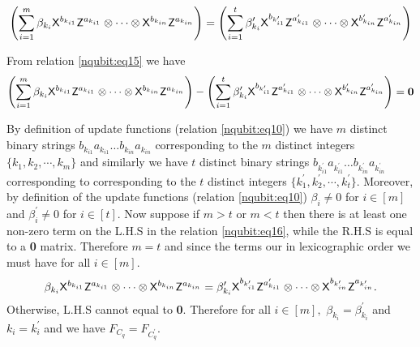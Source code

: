 \begin{equation}
\label{nqubit:eq15}
\begin{aligned}
\left(\sum_{i=1}^m \beta_{k_i} {\sf X}^{b_{k_{i1}}} {\sf Z}^{a_{k_{i1}}} \otimes \cdots  \otimes {\sf X}^{b_{k_{in}}} {\sf Z}^{a_{k_{in}}}\right)=\left(\sum_{i=1}^t \beta_{k_i}^\prime {\sf X}^{b_{k_{i1}^\prime}} {\sf Z}^{a_{k_{i1}}^\prime} \otimes \cdots  \otimes {\sf X}^{b_{k_{in}}^\prime} {\sf Z}^{a_{k_{in}}^\prime}\right)
\end{aligned}
\end{equation}

From relation \ref{nqubit:eq15} we have 
\begin{equation}
\label{nqubit:eq16}
\begin{aligned}
\left(\sum_{i=1}^m \beta_{k_i} {\sf X}^{b_{k_{i1}}} {\sf Z}^{a_{k_{i1}}} \otimes \cdots  \otimes {\sf X}^{b_{k_{in}}} {\sf Z}^{a_{k_{in}}}\right)-\left(\sum_{i=1}^t \beta_{k_i}^\prime {\sf X}^{b_{k_{i1}^\prime}} {\sf Z}^{a_{k_{i1}}^\prime} \otimes \cdots  \otimes {\sf X}^{b_{k_{in}}^\prime} {\sf Z}^{a_{k_{in}}^\prime}\right)={\bf 0}
\end{aligned}
\end{equation}

By definition of update functions (relation \ref{nqubit:eq10}) we have $m$ distinct binary strings $b_{k_{i1}} a_{k_{i1}}\ldots b_{k_{in}} a_{k_{in}}$ corresponding to the $m$ distinct integers $\{k_1,k_2,\cdots, k_m\}$ and similarly we have $t$ distinct binary strings $b_{k_{i1}^\prime} a_{k_{i1}^\prime}\ldots b_{k_{in}^\prime} a_{k_{in}^\prime}$ corresponding to corresponding to the $t$ distinct integers $\{k_1^\prime,k_2^\prime,\cdots, k_t^\prime\}.$  Moreover, by definition of the update functions (relation \ref{nqubit:eq10}) $\beta_i\neq 0$ for $i\in [m]$ and $\beta_i^\prime\neq 0$  for $i\in [t].$ Now suppose if  $m>t$ or $m<t$ then there is at least one non-zero term on the L.H.S
in the relation \ref{nqubit:eq16}, while the R.H.S is equal to a {\bf 0} matrix. Therefore $m=t$ and since the terms our in  lexicographic order we must have for all $i\in[m].$
\begin{equation}
\label{nqubit:eq17}
 \beta_{k_i}{\sf X}^{b_{k_{i1}}} {\sf Z}^{a_{k_{i1}}} \otimes \cdots  \otimes {\sf X}^{b_{k_{in}}} {\sf Z}^{a_{k_{in}}}=\beta_{k_i}^\prime{\sf X}^{b_{k_{i1}^\prime}} {\sf Z}^{a_{k_{i1}}^\prime} \otimes \cdots  \otimes {\sf X}^{b_{k_{in}^\prime}} {\sf Z}^{a_{k_{in}^\prime}}.
\end{equation}
 Otherwise, L.H.S cannot equal to {\bf 0}. Therefore for all $i\in[m],$  $\beta_{k_i}=\beta_{k_i}^\prime$ and $k_i=k_i^\prime$ and we have $F_{C_q}=F_{C_q^\prime}.$


